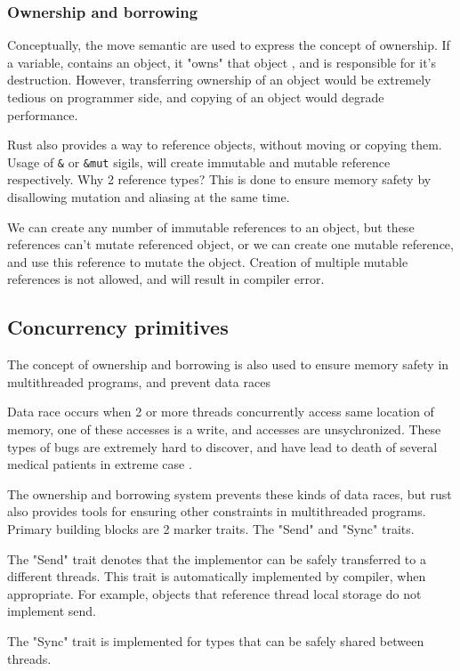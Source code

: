 \subsubsection{Ownership and borrowing}
Conceptually, the move semantic are used to express the concept of ownership. If a variable, contains an object, it "owns"
that object , and is responsible for it's destruction. However, transferring ownership of an object would be extremely
tedious on programmer side, and copying of an object would degrade performance.

Rust also provides a way to reference objects, without moving or copying them. Usage of  \verb|&| or
\verb|&mut| sigils, will create immutable and mutable reference respectively. Why 2 reference types? This is
done to ensure memory safety by disallowing mutation and aliasing at the same time.

We can create any number of immutable references to an object, but these references can't mutate referenced object, or
we can create one mutable reference, and use this reference to mutate the object. Creation of multiple mutable references
is not allowed, and will result in compiler error.


\subsection{Concurrency primitives}
The concept of ownership and borrowing is also used to ensure memory safety in multithreaded programs, and prevent
data races

Data race occurs when 2 or more threads concurrently access same location of memory, one of these accesses is a write,
and accesses are unsychronized. These types of bugs are extremely hard to discover, and have lead to death of several medical patients in
extreme case .

The ownership and borrowing system prevents these kinds of data races, but rust also provides tools for ensuring other
constraints in multithreaded programs. Primary building blocks are 2 marker traits. The "Send" and "Sync" traits.

The "Send" trait denotes that the implementor can be safely transferred to a different threads. This trait is automatically
implemented by compiler, when appropriate. For example, objects that reference thread local storage do not implement send.

The "Sync" trait is implemented for types that can be safely shared between threads.

